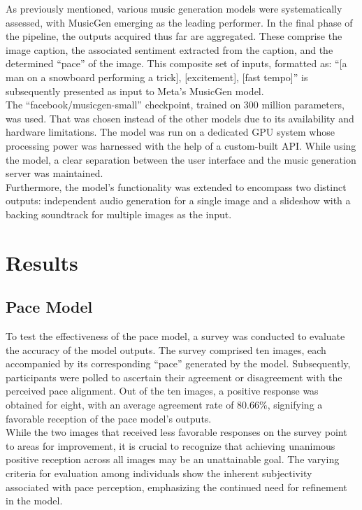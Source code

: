 \documentclass[conference]{IEEEtran}
\begin{document}
As previously mentioned, various music generation models were systematically assessed, with MusicGen emerging as the leading performer. In the final phase of the pipeline, the outputs acquired thus far are aggregated. These comprise the image caption, the associated sentiment extracted from the caption, and the determined ``pace'' of the image. This composite set of inputs, formatted as: ``[a man on a snowboard performing a trick], [excitement], [fast tempo]'' is subsequently presented as input to Meta's MusicGen model.
\\

The ``facebook/musicgen-small'' checkpoint, trained on 300 million parameters, was used. That was chosen instead of the other models due to its availability and hardware limitations. The model was run on a dedicated GPU system whose processing power was harnessed with the help of a custom-built API. While using the model, a clear separation between the user interface and the music generation server was maintained.
\\

Furthermore, the model's functionality was extended to encompass two distinct outputs: independent audio generation for a single image and a slideshow with a backing soundtrack for multiple images as the input.

\section*{Results}

\subsection*{Pace Model}

To test the effectiveness of the pace model, a survey was conducted to evaluate the accuracy of the model outputs. The survey comprised ten images, each accompanied by its corresponding ``pace'' generated by the model. Subsequently, participants were polled to ascertain their agreement or disagreement with the perceived pace alignment. Out of the ten images, a positive response was obtained for eight, with an average agreement rate of 80.66\%, signifying a favorable reception of the pace model's outputs.
\\

While the two images that received less favorable responses on the survey point to areas for improvement, it is crucial to recognize that achieving unanimous positive reception across all images may be an unattainable goal. The varying criteria for evaluation among individuals show the inherent subjectivity associated with pace perception, emphasizing the continued need for refinement in the model.
\end{document}
